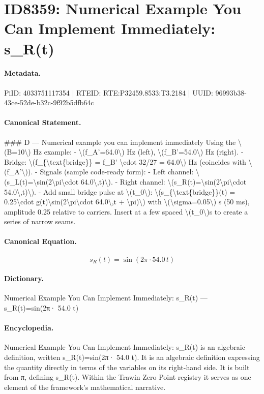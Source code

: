 \section*{ID8359: Numerical Example You Can Implement Immediately: s\_R(t)}
\paragraph{Metadata.}
PiID: 4033751117354 | RTEID: RTE:P32459.8533:T3.2184 | UUID: 96993b38-43ce-52de-b32c-9f92b5dfb64c

\paragraph{Canonical Statement.}
\#\#\# D — Numerical example you can implement immediately Using the \textbackslash{}(B=10\textbackslash{}) Hz example: - \textbackslash{}(f\_A'=64.0\textbackslash{}) Hz (left), \textbackslash{}(f\_B'=54.0\textbackslash{}) Hz (right). - Bridge: \textbackslash{}(f\_\{\textbackslash{}text\{bridge\}\} = f\_B' \textbackslash{}cdot 32/27 = 64.0\textbackslash{}) Hz (coincides with \textbackslash{}(f\_A'\textbackslash{})). - Signals (sample code-ready form): - Left channel: \textbackslash{}(s\_L(t)=\textbackslash{}sin(2\textbackslash{}pi\textbackslash{}cdot 64.0\textbackslash{},t)\textbackslash{}). - Right channel: \textbackslash{}(s\_R(t)=\textbackslash{}sin(2\textbackslash{}pi\textbackslash{}cdot 54.0\textbackslash{},t)\textbackslash{}). - Add small bridge pulse at \textbackslash{}(t\_0\textbackslash{}): \textbackslash{}(s\_\{\textbackslash{}text\{bridge\}\}(t) = 0.25\textbackslash{}cdot g(t)\textbackslash{}sin(2\textbackslash{}pi\textbackslash{}cdot 64.0\textbackslash{},t + \textbackslash{}pi)\textbackslash{}) with \textbackslash{}(\textbackslash{}sigma=0.05\textbackslash{}) s (50 ms), amplitude 0.25 relative to carriers. Insert at a few spaced \textbackslash{}(t\_0\textbackslash{})s to create a series of narrow seams.

\paragraph{Canonical Equation.}
\[
s_R(t)=\sin(2\pi\cdot 54.0\,t)
\]

\paragraph{Dictionary.}
Numerical Example You Can Implement Immediately: s\_R(t) — s\_R(t)=sin(2π· 54.0 t)

\paragraph{Encyclopedia.}
Numerical Example You Can Implement Immediately: s\_R(t) is an algebraic definition, written s\_R(t)=sin(2π· 54.0 t). It is an algebraic definition expressing the quantity directly in terms of the variables on its right-hand side. It is built from π, defining s\_R(t). Within the Trawin Zero Point registry it serves as one element of the framework's mathematical narrative.
